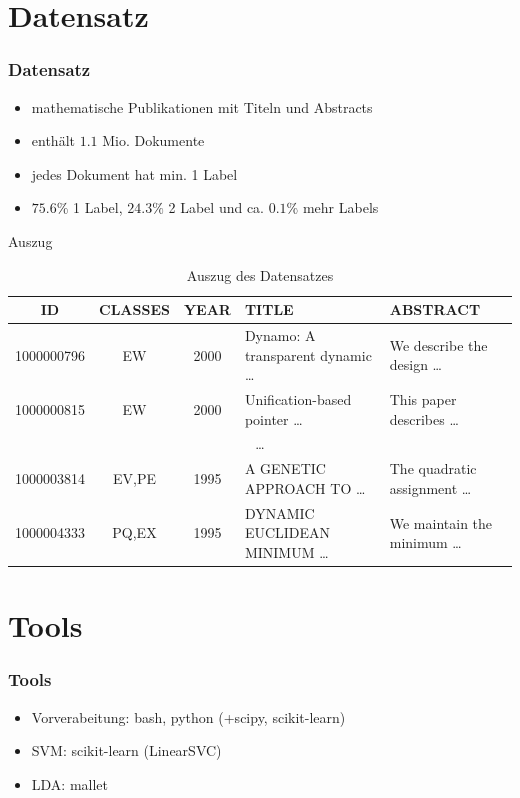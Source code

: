 \documentclass[12pt, xcolor=table]{beamer}
\begin{document}
\section{Datensatz}
\begin{frame}
    \frametitle{Datensatz}
    \begin{itemize}
        \item mathematische Publikationen mit Titeln und Abstracts
        \item enthält  $1.1$ Mio. Dokumente
        \item jedes Dokument hat min. 1 Label
        \item $75.6 \%$ 1 Label, $24.3 \%$ 2 Label und ca. $0.1 \%$ mehr Labels
    \end{itemize}
    \begin{block}{Auszug}
        \begin{table}
            \begin{tabular}{cccll}
                \tiny\textbf{ID} &\tiny \textbf{CLASSES} &\tiny \textbf{YEAR} &\tiny \textbf{TITLE} & \tiny \textbf{ABSTRACT} \\
                \hline
                \tiny 1000000796 &\tiny EW & \tiny 2000 & \tiny Dynamo: A transparent dynamic \dots  & \tiny We describe the design \dots \\
                \tiny 1000000815 &\tiny EW & \tiny 2000 & \tiny Unification-based pointer \dots  & \tiny This paper describes \dots \\
                \multicolumn{5}{c}{\dots} \\
                \tiny 1000003814 &\tiny EV,PE & \tiny 1995 & \tiny A GENETIC APPROACH TO \dots  & \tiny The quadratic assignment \dots \\
                \tiny 1000004333 & \tiny PQ,EX &\tiny 1995 &\tiny DYNAMIC EUCLIDEAN MINIMUM \dots & \tiny We maintain the minimum \dots \\
            \end{tabular}
             \caption*{Auszug des Datensatzes}
        \end{table}
    \end{block}
\end{frame}


\section{Tools}
\begin{frame}
    \frametitle{Tools}
    \begin{itemize}
        \item Vorverabeitung: bash, python (+scipy, scikit-learn)
        \item SVM: scikit-learn (LinearSVC)
        \item LDA: mallet
    \end{itemize}
\end{frame}
\end{document}
